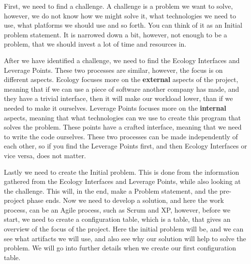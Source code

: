 First, we need to find a challenge.
A challenge is a problem we want to solve, however, we do not know how we might solve it, what technologies we need to use, what platforms we should use and so forth.
You can think of it as an Initial problem statement.
It is narrowed down a bit, however, not enough to be a problem, that we should invest a lot of time and resources in.

After we have identified a challenge, we need to find the Ecology Interfaces and Leverage Points.
These two processes are similar, however, the focus is on different aspects.
Ecology focuses more on the \textbf{external} aspects of the project, meaning that if we can use a piece of software another company has made, and they have a trivial interface, then it will make our workload lower, than if we needed to make it ourselves.
Leverage Points focuses more on the \textbf{internal} aspects, meaning that what technologies can we use to create this program that solves the problem.
These points have a crafted interface, meaning that we need to write the code ourselves.
These two processes can be made independently of each other, so if you find the Leverage Points first, and then Ecology Interfaces or vice versa, does not matter.

Lastly we need to create the Initial problem. 
This is done from the information gathered from the Ecology Interfaces and Leverage Points, while also looking at the challenge.
This will, in the end, make a Problem statement, and the pre-project phase ends.
Now we need to develop a solution, and here the work process, can be an Agile process, such as Scrum and XP, however, before we start, we need to create a configuration table, which is a table, that gives an overview of the focus of the project. Here the initial problem will be, and we can see what artifacts we will use, and also see why our solution will help to solve the problem.
We will go into further details when we create our first configuration table.
